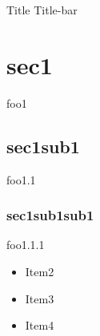 \documentclass[ngerman,ignorenonframetext,20,aspectratio=1610]{beamer}
\begin{document}
    \begin{frame}{Title}
        Title-bar

        \section{sec1} foo1

        \subsection{sec1sub1} foo1.1

        \subsubsection{sec1sub1sub1} foo1.1.1

        \begin{itemize}
            \item Item2
            \item Item3
            \item Item4
        \end{itemize}

    \end{frame}
\end{document}
